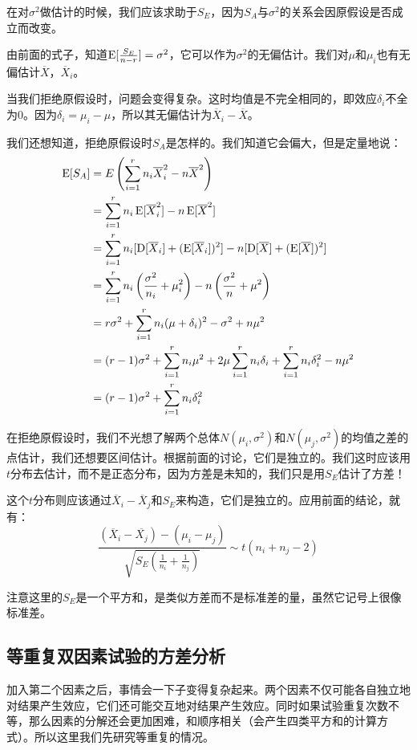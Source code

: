 在对$\sigma^2$做估计的时候，我们应该求助于$S_E$，因为$S_A$与$\sigma^2$的关系会因原假设是否成立而改变。

由前面的式子，知道$\operatorname{E}[\frac{S_E}{n-r}] =\sigma^2$，它可以作为$\sigma^2$的无偏估计。我们对$\mu$和$\mu_i$也有无偏估计$\overline{X}$，$\overline{X}_i$。

当我们拒绝原假设时，问题会变得复杂。这时均值是不完全相同的，即效应$\delta_i$不全为$0$。因为$\delta_i = \mu_i -\mu$，所以其无偏估计为$\overline{X}_i-\overline{X}$。

我们还想知道，拒绝原假设时$S_A$是怎样的。我们知道它会偏大，但是定量地说：
\begin{align*}
\operatorname{E}[S_A] &= E\left( \sum_{i=1}^r n_i \overline{X}_i^2 -n\overline{X}^2 \right) \\
& = \sum_{i=1}^r n_i \operatorname{E}[\overline{X}_i^2] - n\operatorname{E}[\overline{X}^2]\\
& = \sum_{i=1}^r n_i [\operatorname{D}[\overline{X}_i]+(\operatorname{E}[\overline{X}_i])^2] - n[\operatorname{D}[\overline{X}]+(\operatorname{E}[\overline{X}])^2]\\
&= \sum_{i=1}^r n_i\left( \frac{\sigma^2}{n_i}+\mu_i^2\right) - n\left(\frac{\sigma^2}{n} +\mu^2 \right)\\
&= r\sigma^2 +\sum_{i=1}^r n_i(\mu+\delta_i)^2 - \sigma^2 +n\mu^2\\
&= (r-1)\sigma^2 + \sum_{i=1}^r n_i\mu^2 +2\mu\sum_{i=1}^r n_i\delta_i +\sum_{i=1}^rn_i\delta_i^2 - n\mu^2\\
&= (r-1)\sigma^2 +\sum_{i=1}^rn_i\delta_i^2
\end{align*}

在拒绝原假设时，我们不光想了解两个总体$N(\mu_i,\sigma^2)$和$N(\mu_j,\sigma^2)$的均值之差的点估计，我们还想要区间估计。根据前面的讨论，它们是独立的。我们这时应该用$t$分布去估计，而不是正态分布，因为方差是未知的，我们只是用$S_E$估计了方差！

这个$t$分布则应该通过$\overline{X}_i-\overline{X}_j$和$S_E$来构造，它们是独立的。应用前面的结论，就有：
\[
\frac{(\overline{X}_i-\overline{X_j})-(\mu_i-\mu_j)}{\sqrt{S_E\left(\frac{1}{n_i}+\frac{1}{n_j}\right)}} \sim t(n_i+n_j-2)
\]

注意这里的$S_E$是一个平方和，是类似方差而不是标准差的量，虽然它记号上很像标准差。

\subsection{等重复双因素试验的方差分析}

加入第二个因素之后，事情会一下子变得复杂起来。两个因素不仅可能各自独立地对结果产生效应，它们还可能交互地对结果产生效应。同时如果试验重复次数不等，那么因素的分解还会更加困难，和顺序相关（会产生四类平方和的计算方式）。所以这里我们先研究等重复的情况。

